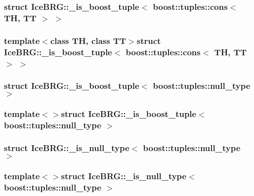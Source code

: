 \subsubsection{struct Ice\-B\-R\-G\-:\-:\-\_\-is\-\_\-boost\-\_\-tuple$<$ boost\-:\-:tuples\-:\-:cons$<$ T\-H, T\-T $>$ $>$}
\subsubsection*{template$<$class T\-H, class T\-T$>$struct Ice\-B\-R\-G\-::\-\_\-is\-\_\-boost\-\_\-tuple$<$ boost\-::tuples\-::cons$<$ T\-H, T\-T $>$ $>$}

\label{structIceBRG_1_1__is__boost__tuple_3_01boost_1_1tuples_1_1null__type_01_4}
\hypertarget{namespaceIceBRG_structIceBRG_1_1__is__boost__tuple_3_01boost_1_1tuples_1_1null__type_01_4}{}
\subsubsection{struct Ice\-B\-R\-G\-:\-:\-\_\-is\-\_\-boost\-\_\-tuple$<$ boost\-:\-:tuples\-:\-:null\-\_\-type $>$}
\subsubsection*{template$<$$>$struct Ice\-B\-R\-G\-::\-\_\-is\-\_\-boost\-\_\-tuple$<$ boost\-::tuples\-::null\-\_\-type $>$}

\label{structIceBRG_1_1__is__null__type_3_01boost_1_1tuples_1_1null__type_01_4}
\hypertarget{namespaceIceBRG_structIceBRG_1_1__is__null__type_3_01boost_1_1tuples_1_1null__type_01_4}{}
\subsubsection{struct Ice\-B\-R\-G\-:\-:\-\_\-is\-\_\-null\-\_\-type$<$ boost\-:\-:tuples\-:\-:null\-\_\-type $>$}
\subsubsection*{template$<$$>$struct Ice\-B\-R\-G\-::\-\_\-is\-\_\-null\-\_\-type$<$ boost\-::tuples\-::null\-\_\-type $>$}

\label{structIceBRG_1_1is__container}
\hypertarget{namespaceIceBRG_structIceBRG_1_1is__container}{}
